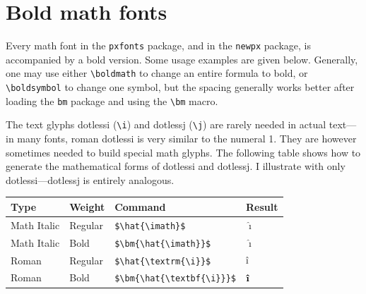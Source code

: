 \documentclass[11pt]{article}
\theoremstyle{oldplain}
\theoremstyle{plain}
\begin{document}
\section{Bold math fonts}\label{sec:boldmath}
Every math font in the {\tt pxfonts} package, and in the {\tt newpx} package, is accompanied by a bold version. Some usage examples are given below. Generally, one may use either \verb|\boldmath| to change an entire formula to bold, or \verb|\boldsymbol| to change one symbol, but the spacing generally works better after loading the {\tt bm} package and using the \verb|\bm| macro.

The text glyphs dotlessi (\verb|\i|) and dotlessj (\verb|\j|) are rarely needed in actual text---in many fonts, roman dotlessi is very similar to the numeral 1. They are however sometimes needed to build special math glyphs. The following table shows how to generate the mathematical forms of dotlessi and dotlessj. I illustrate with only dotlessi---dotlessj is entirely analogous.

\begin{center}
  \begin{tabular}{@{} llll @{}}
    \hline
    Type & Weight & Command & Result \\ 
    \hline
    Math Italic & Regular & \verb|$\hat{\imath}$| & $\hat{\imath}$ \\ 
    Math Italic & Bold & \verb|$\bm{\hat{\imath}}$| & $\bm{\hat{\imath}}$ \\ 
    Roman & Regular & \verb|$\hat{\textrm{\i}}$| & $\hat{\textrm{\i}}$\\ 
    Roman & Bold & \verb|$\bm{\hat{\textbf{\i}}}$| & $\bm{\hat{\textbf{\i}}}$\\ 
    \hline
  \end{tabular}
\end{center}
\newcommand{\xyvec}[2]{\ensuremath{#1\bm{\textbf{\i}}#2\bm{\textbf{\j}}}}
\end{document}
